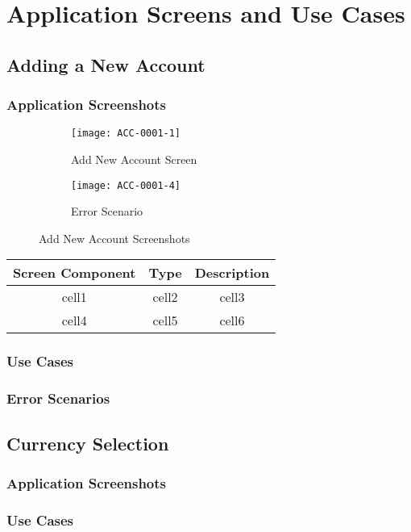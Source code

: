 \section{Application Screens and Use Cases}

\subsection{Adding a New Account}

\subsubsection{Application Screenshots}
\begin{figure}[h]
 
\begin{subfigure}{0.5\textwidth}
  \texttt{[image: ACC-0001-1]} 
  \caption{Add New Account Screen}
  \label{fig:sub-account-1}
\end{subfigure}
\begin{subfigure}{0.5\textwidth}
  \texttt{[image: ACC-0001-4]}
  \caption{Error Scenario}
  \label{fig:sub-account-2}
\end{subfigure}
 
\caption{Add New Account Screenshots}
\label{fig:account-1}
\end{figure}

\begin{center}
\begin{tabular}{ |c|c|c| } 
  \hline
  \textbf{Screen Component} & \textbf{Type} & \textbf{Description} \\ 
  \hline
  cell1 & cell2 & cell3 \\ 
  \hline
  cell4 & cell5 & cell6 \\ 
  \hline
\end{tabular}
\end{center}

\subsubsection{Use Cases}
\subsubsection{Error Scenarios}

\subsection{Currency Selection}

\subsubsection{Application Screenshots}
\subsubsection{Use Cases}
